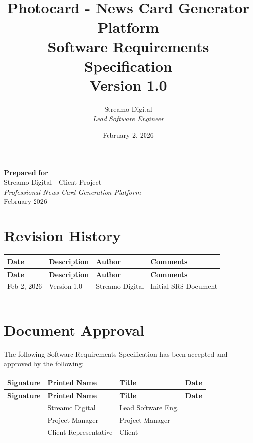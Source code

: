 \documentclass[12pt,a4paper]{article}
\title{\textbf{Photocard - News Card Generator Platform}\\
\vspace{0.5cm}
\Large Software Requirements Specification\\
\vspace{0.5cm}
\large Version 1.0}
\author{
    Streamo Digital\\
    \textit{Lead Software Engineer}
}
\date{February 2, 2026}
\begin{document}
\maketitle
\thispagestyle{empty}

\vspace{2cm}

\begin{center}
\textbf{Prepared for}\\
Streamo Digital - Client Project\\
\vspace{0.5cm}
\textit{Professional News Card Generation Platform}\\
February 2026
\end{center}

\newpage

\section*{Revision History}

\begin{longtable}{|p{2.5cm}|p{3cm}|p{3cm}|p{4.5cm}|}
\hline
\textbf{Date} & \textbf{Description} & \textbf{Author} & \textbf{Comments} \\
\hline
\endfirsthead

\hline
\textbf{Date} & \textbf{Description} & \textbf{Author} & \textbf{Comments} \\
\hline
\endhead

Feb 2, 2026 & Version 1.0 & Streamo Digital & Initial SRS Document \\
\hline
 & & & \\
\hline
 & & & \\
\hline
 & & & \\
\hline
\end{longtable}

\vspace{1cm}

\section*{Document Approval}

The following Software Requirements Specification has been accepted and approved by the following:

\vspace{0.5cm}

\begin{longtable}{|p{3.5cm}|p{3.5cm}|p{3.5cm}|p{2.5cm}|}
\hline
\textbf{Signature} & \textbf{Printed Name} & \textbf{Title} & \textbf{Date} \\
\hline
\endfirsthead

\hline
\textbf{Signature} & \textbf{Printed Name} & \textbf{Title} & \textbf{Date} \\
\hline
\endhead

 & Streamo Digital & Lead Software Eng. & \\
\hline
 & Project Manager & Project Manager & \\
\hline
 & Client Representative & Client & \\
\hline
\end{longtable}
\end{document}
